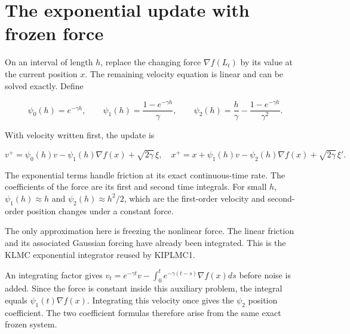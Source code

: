 \documentclass[11pt,a4paper]{article}
\begin{document}
\section{\texorpdfstring{The exponential update with frozen force}{The exponential update with frozen force}}


On an interval of length \(h\), replace the changing force
\(\nabla f(L_t)\) by its value at the current position \(x\). The remaining
velocity equation is linear and can be solved exactly. Define


\[\psi_0(h)=e^{-\gamma h},\qquad
\psi_1(h)=\frac{1-e^{-\gamma h}}\gamma,\qquad
\psi_2(h)=\frac h\gamma-\frac{1-e^{-\gamma h}}{\gamma^2}.\]


With velocity written first, the update is


\[v^+=\psi_0(h)v-\psi_1(h)\nabla f(x)+\sqrt{2\gamma}\,\xi,
\quad x^+=x+\psi_1(h)v-\psi_2(h)\nabla f(x)+\sqrt{2\gamma}\,\xi'.\]


The exponential terms handle friction at its exact continuous-time rate.
The coefficients of the force are its first and second time integrals. For
small \(h\), \(\psi_1(h)\approx h\) and \(\psi_2(h)\approx h^2/2\),
which are the first-order velocity and second-order position changes
under a constant force.




The only approximation here is freezing the nonlinear force. The linear
friction and its associated Gaussian forcing have already been integrated.
This is the KLMC exponential integrator reused by KIPLMC1.



An integrating factor gives \(v_t=e^{-\gamma t}v-\int_0^te^{-\gamma(t-s)}\nabla f(x)ds\) before noise is added. Since the force is constant inside this auxiliary problem, the integral equals \(\psi_1(t)\nabla f(x)\). Integrating this velocity once gives the \(\psi_2\) position coefficient. The two coefficient formulas therefore arise from the same exact frozen system.
\end{document}
